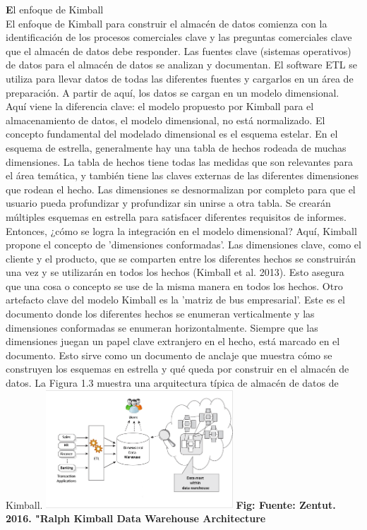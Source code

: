 \documentclass[twoside,twocolumn]{article}
\begin{document}
\begin{enumerate}
   
\textbf El enfoque de Kimball \\ 


El enfoque de Kimball para construir el almacén de datos comienza con la identificación de los procesos comerciales clave y las preguntas comerciales clave que el almacén de datos debe responder. Las fuentes clave (sistemas operativos) de datos para el almacén de datos se analizan y documentan. El software ETL se utiliza para llevar datos de todas las diferentes fuentes y cargarlos en un área de preparación. A partir de aquí, los datos se cargan en un modelo dimensional. Aquí viene la diferencia clave: el modelo propuesto por Kimball para el almacenamiento de datos, el modelo dimensional, no está normalizado. El concepto fundamental del modelado dimensional es el esquema estelar. En el esquema de estrella, generalmente hay una tabla de hechos rodeada de muchas dimensiones. La tabla de hechos tiene todas las medidas que son relevantes para el área temática, y también tiene las claves externas de las diferentes dimensiones que rodean el hecho. Las dimensiones se desnormalizan por completo para que el usuario pueda profundizar y profundizar sin unirse a otra tabla. Se crearán múltiples esquemas en estrella para satisfacer diferentes requisitos de informes. Entonces, ¿cómo se logra la integración en el modelo dimensional? Aquí, Kimball propone el concepto de 'dimensiones conformadas'. Las dimensiones clave, como el cliente y el producto, que se comparten entre los diferentes hechos se construirán una vez y se utilizarán en todos los hechos (Kimball et al. 2013). Esto asegura que una cosa o concepto se use de la misma manera en todos los hechos. Otro artefacto clave del modelo Kimball es la 'matriz de bus empresarial'. Este es el documento donde los diferentes hechos se enumeran verticalmente y las dimensiones conformadas se enumeran horizontalmente. Siempre que las dimensiones juegan un papel clave extranjero en el hecho, está marcado en el documento. Esto sirve como un documento de anclaje que muestra cómo se construyen los esquemas en estrella y qué queda por construir en el almacén de datos. La Figura 1.3 muestra una arquitectura típica de almacén de datos de Kimball.
\includegraphics[width=7cm]{Imagenes/2.png}
\textbf{ {\small  Fig: Fuente: Zentut. 2016. "Ralph Kimball Data Warehouse Architecture}}
\\ \\


\end{enumerate}
\end{document}

